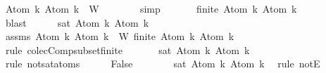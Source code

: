 \begin{isabellebody}
\ {\isachardoublequoteopen}{\isacharbraceleft}Atom\ k{\isacharcomma}\ \isactrlbold {\isasymnot}{\isacharparenleft}Atom\ k{\isacharparenright}{\isacharbraceright}\ {\isasymsubseteq}\ W{\isachardoublequoteclose}\isanewline
\ \ \ \ \ \ \isamarkupfalse%
\ simp\ \isanewline
\ \ \ \ \isamarkupfalse%
\ {\isachardoublequoteopen}finite\ {\isacharbraceleft}Atom\ k{\isacharcomma}\ \isactrlbold {\isasymnot}{\isacharparenleft}Atom\ k{\isacharparenright}{\isacharbraceright}{\isachardoublequoteclose}\isanewline
\ \ \ \ \ \ \isamarkupfalse%
\ blast\isanewline
\ \ \ \ \isamarkupfalse%
\ {\isachardoublequoteopen}sat\ {\isacharparenleft}{\isacharbraceleft}Atom\ k{\isacharcomma}\ \isactrlbold {\isasymnot}{\isacharparenleft}Atom\ k{\isacharparenright}{\isacharbraceright}{\isacharparenright}{\isachardoublequoteclose}\isanewline
\ \ \ \ \ \ \isamarkupfalse%
\ assms\ {\isacartoucheopen}{\isacharbraceleft}Atom\ k{\isacharcomma}\ \isactrlbold {\isasymnot}{\isacharparenleft}Atom\ k{\isacharparenright}{\isacharbraceright}\ {\isasymsubseteq}\ W{\isacartoucheclose}\ {\isacartoucheopen}finite\ {\isacharbraceleft}Atom\ k{\isacharcomma}\ \isactrlbold {\isasymnot}{\isacharparenleft}Atom\ k{\isacharparenright}{\isacharbraceright}{\isacartoucheclose}\ \isamarkupfalse%
\ {\isacharparenleft}rule\ colecComp{\isacharunderscore}subset{\isacharunderscore}finite{\isacharparenright}\isanewline
\ \ \ \ \isamarkupfalse%
\ {\isachardoublequoteopen}{\isasymnot}\ sat\ {\isacharparenleft}{\isacharbraceleft}Atom\ k{\isacharcomma}\ \isactrlbold {\isasymnot}{\isacharparenleft}Atom\ k{\isacharparenright}{\isacharbraceright}{\isacharparenright}{\isachardoublequoteclose}\isanewline
\ \ \ \ \ \ \isamarkupfalse%
\ {\isacharparenleft}rule\ not{\isacharunderscore}sat{\isacharunderscore}atoms{\isacharparenright}\isanewline
\ \ \ \ \isamarkupfalse%
\ {\isachardoublequoteopen}False{\isachardoublequoteclose}\isanewline
\ \ \ \ \ \ \isamarkupfalse%
\ {\isacartoucheopen}sat\ {\isacharparenleft}{\isacharbraceleft}Atom\ k{\isacharcomma}\ \isactrlbold {\isasymnot}{\isacharparenleft}Atom\ k{\isacharparenright}{\isacharbraceright}{\isacharparenright}{\isacartoucheclose}\ \isamarkupfalse%
\ {\isacharparenleft}rule\ notE{\isacharparenright}\isanewline
\ \ \isamarkupfalse%
\isanewline
{}\isamarkupfalse%
%
\endisatagproof
{\isafoldproof}%
%
\isadelimproof
\isanewline
%
\endisadelimproof
\isanewline
{}\isamarkupfalse%

\end{isabellebody}
